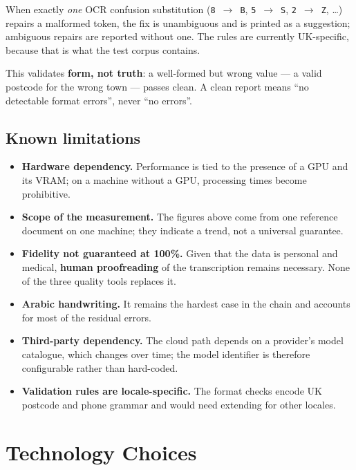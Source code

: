 \documentclass[11pt,a4paper]{article}
\begin{document}
When exactly \emph{one} OCR confusion substitution
(\texttt{8}~$\rightarrow$~\texttt{B}, \texttt{5}~$\rightarrow$~\texttt{S},
\texttt{2}~$\rightarrow$~\texttt{Z}, \dots) repairs a malformed token, the fix
is unambiguous and is printed as a suggestion; ambiguous repairs are reported
without one. The rules are currently UK-specific, because that is what the test
corpus contains.

This validates \textbf{form, not truth}: a well-formed but wrong value --- a
valid postcode for the wrong town --- passes clean. A clean report means ``no
detectable format errors'', never ``no errors''.

\subsection{Known limitations}
\begin{itemize}
  \item \textbf{Hardware dependency.} Performance is tied to the presence of a
        GPU and its VRAM; on a machine without a GPU, processing times become
        prohibitive.
  \item \textbf{Scope of the measurement.} The figures above come from one
        reference document on one machine; they indicate a trend, not a
        universal guarantee.
  \item \textbf{Fidelity not guaranteed at 100\%.} Given that the data is
        personal and medical, \textbf{human proofreading} of the transcription
        remains necessary. None of the three quality tools replaces it.
  \item \textbf{Arabic handwriting.} It remains the hardest case in the chain
        and accounts for most of the residual errors.
  \item \textbf{Third-party dependency.} The cloud path depends on a provider's
        model catalogue, which changes over time; the model identifier is
        therefore configurable rather than hard-coded.
  \item \textbf{Validation rules are locale-specific.} The format checks encode
        UK postcode and phone grammar and would need extending for other
        locales.
\end{itemize}

\section{Technology Choices}
\end{document}
